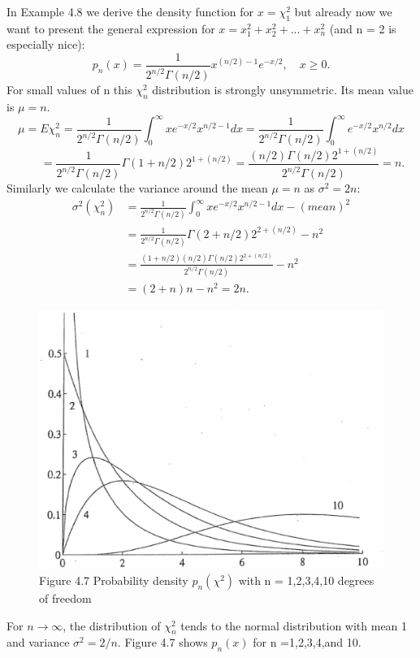 	In Example 4.8 we derive the density function for $x=\chi^2_1$ but already now we want
	to present the general expression for $x=x^2_1+x^2_2+...+x^2_n$ (and n = 2 is especially nice):
   \begin{equation}
   p_n(x)=\frac{1}{2^{n/2}\Gamma (n/2)}x^{(n/2)-1}e^{-x/2},
   \quad x\geq 0.
   \end{equation}
   For small values of n this $\chi^2_n$ distribution is strongly unsymmetric. Its mean value is $\mu=n$.
   \begin{equation}
   \mu=E{\chi^2_n}=\frac{1}{2^{n/2}\Gamma (n/2)}\int^{\infty}_0 xe^{-x/2}x^{n/2-1}dx =\frac{1}{2^{n/2}\Gamma (n/2)}\int^{\infty}_0 e^{-x/2}x^{n/2}dx
   \end{equation}
   \begin{equation*}
   \qquad =\frac{1}{2^{n/2}\Gamma (n/2)}\Gamma (1+n/2)2^{1+(n/2)}=\frac{(n/2)\Gamma (n/2)2^{1+(n/2)}}{2^{n/2}\Gamma (n/2)}=n.
   \end{equation*}
	Similarly we calculate the variance around the mean $\mu=n$ as $\sigma^2=2n$:
	\begin{equation}
	\begin{split}
	\sigma^2(\chi^2_n)&=\frac{1}{2^{n/2}\Gamma (n/2)}\int^{\infty}_0 xe^{-x/2}x^{n/2-1}dx-(mean)^2 \\
	&=\frac{1}{2^{n/2}\Gamma (n/2)}\Gamma (2+n/2)2^{2+(n/2)}-n^2 \\
	&=\frac{(1+n/2)(n/2)\Gamma (n/2)2^{2+(n/2)}}{2^{n/2}\Gamma (n/2)}-n^2\\
	&=(2+n)n-n^2=2n.
	\end{split}	
	\end{equation}

	\begin{figure}[h]
		\centering
		\includegraphics[width=0.7\linewidth]{TeX_files/Part02/chapter04/image/4-7}
		\caption{Figure 4.7\; Probability density $p_n(\chi^2)$ with n = 1,2,3,4,10 degrees of freedom}
		\label{fig:4-7}
	\end{figure}	
	For $n\longrightarrow\infty$, the distribution of $\chi^2_n$ tends to the normal distribution with mean 1 and variance $\sigma^2=2/n$. Figure 4.7 shows $p_n(x)$ for n =1,2,3,4,and 10.
	
